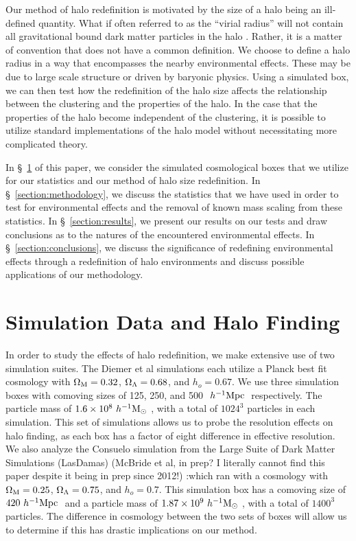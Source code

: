 \documentclass[usenatbib,usegraphicx,letterpaper]{mn2e}
\begin{document}
Our method of halo redefinition is motivated by the size of a halo being an ill-defined quantity. What if often referred to as the ``virial radius'' will not contain all gravitational bound dark matter particles in the halo \citep{kazan06}. Rather, it is a matter of convention that does not have a common definition. We choose to define a halo radius in a way that encompasses the nearby environmental effects. These may be due to large scale structure or driven by baryonic physics. Using a simulated box, we can then test how the redefinition of the halo size affects the relationship between the clustering and the properties of the halo. In the case that the properties of the halo become independent of the clustering, it is possible to utilize standard implementations of the halo model without necessitating more complicated theory.
 
In \S~\ref{section:data} of this paper, we consider the simulated cosmological boxes that we utilize for our statistics and our method of halo size redefinition. In \S~\ref{section:methodology}, we discuss the statistics that we have used in order to test for environmental effects and the removal of known mass scaling from these statistics. In \S~\ref{section:results}, we present our results on our tests and draw conclusions as to the natures of the encountered environmental effects. In \S~\ref{section:conclusions}, we discuss the significance of redefining environmental effects through a redefinition of halo environments and discuss possible applications of our methodology.

\section[]{Simulation Data and Halo Finding}
\label{section:data}

In order to study the effects of halo redefinition, we make extensive use of two simulation suites. The Diemer et al simulations each utilize a Planck best fit cosmology with $\Omega_{\mathrm{M}} = 0.32$, $\Omega_{\Lambda} = 0.68$, and $h_o = 0.67$. We use three simulation boxes with comoving sizes of 125, 250, and 500 $\ h^{-1}\mathrm{Mpc}~$ respectively. The particle mass of $1.6 \times 10^8 \ h^{-1}\mathrm{M}_{\odot}~$, with a total of $1024^3$ particles in each simulation. This set of simulations allows us to probe the resolution effects on halo finding, as each box has a factor of eight difference in effective resolution. We also analyze the Consuelo simulation from the Large Suite of Dark Matter Simulations (LasDamas) (McBride et al, in prep? I literally cannot find this paper despite it being in prep since 2012!) :which ran with a cosmology with $\Omega_{\mathrm{M}} = 0.25$, $\Omega_{\Lambda} = 0.75$, and $h_o = 0.7$. This simulation box has a comoving size of $420 \ h^{-1}\mathrm{Mpc}~$ and a particle mass of $1.87\times 10^9 \ h^{-1}\mathrm{M}_{\odot}~$, with a total of $1400^3$ particles. The difference in cosmology between the two sets of boxes will allow us to determine if this has drastic implications on our method.
\end{document}
